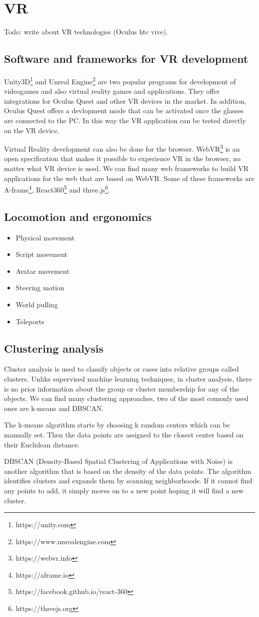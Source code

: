 \section{VR}
Todo: write about VR technologies (Oculus htc vive).

\subsection{Software and frameworks for VR development}
Unity3D\footnote{https://unity.com} and Unreal Engine\footnote{https://www.unrealengine.com} are two popular programs for development of videogames and also virtual reality games and applications. They offer integrations for Oculus Quest and other VR devices in the market. In addition, Oculus Quest offers a devlopment mode that can be activated once the glasses are connected to the PC. In this way the VR application can be tested directly on the VR device.

Virtual Reality development can also be done for the browser. WebVR\footnote{https://webvr.info} is an open specification that makes it possible to experience VR in the browser, no matter what VR device is used. We can find many web frameworks to build VR applications for the web that are based on WebVR. Some of these frameworks are A-frame\footnote{https://aframe.io}, React360\footnote{https://facebook.github.io/react-360} and three.js\footnote{https://threejs.org}.

\subsection{Locomotion and ergonomics}
\begin{itemize}
  \item Physical movement
  \item Script movement
  \item Avatar movement
  \item Steering motion
  \item World pulling
  \item Teleports
\end{itemize}

\subsection{Clustering analysis}
Cluster analysis is used to classify objects or cases into relative groups called clusters. Unlike supervised machine learning techniques, in cluster analysis, there is no prior information about the group or cluster membership for any of the objects. We can find many clustering approaches, two of the most comonly used ones are k-means and DBSCAN.

The k-means algorithm starts by choosing k random centers which can be manually set. Then the data points are assigned to the closest center based on their Euclidean distance.

DBSCAN (Density-Based Spatial Clustering of Applications with Noise) is another algorithm that is based on the density of the data points. The algorithm identifies clusters and expands them by scanning neighborhoods. If it cannot find any points to add, it simply moves on to a new point hoping it will find a new cluster.
